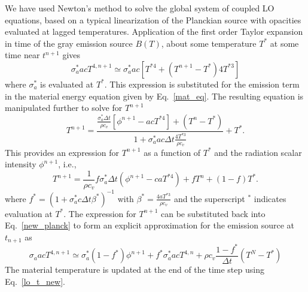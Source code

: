 \documentclass{mc2013}
\begin{document}
We have used Newton's method to solve the global system of coupled LO
equations, based on a typical linearization of the Planckian source with opacities
evaluated at lagged temperatures. Application of the first order Taylor expansion in time of the
gray emission source $B(T)$, about some temperature $T^*$ at some
time near $t^{n+1}$ gives
\begin{equation}\label{new_planck}
    \sigma_a^* a c T^{4,n+1} \simeq \sigma_a^* a c \left[T^{*4} + (T^{n+1} - T^*) 4T^{*3} \right]
\end{equation}
where $\sigma_a^*$ is evaluated at $T^*$. This expression is substituted for the
emission term in the material
energy equation given by Eq.~\eqref{mat_eq}.  The resulting equation is manipulated
further to solve for $T^{n+1}$
\begin{equation}
 T^{n+1}  = \frac{ {\displaystyle \frac{\sigma_a^* \Delta t}{\rho
c_v}}  \left[ \phi^{n+1} -  a c T^{*4} \right] + (T^n - T^*) }{1 +
        \sigma_a^* a c \Delta t\frac{\displaystyle 4
T^{*3}}{\displaystyle \rho c_v } } + T^*.
\end{equation}
This provides an expression for $T^{n+1}$ as a
function of $T^*$ and the radiation scalar intensity $\phi^{n+1}$, i.e.,
\begin{equation}
\label{lo_t_new}
T^{n+1}  = \frac{1}{\rho c_v } f\sigma_a^* \Delta t \left( \phi^{n+1} - c a T^{*4} \right)
+ f T^n + (1-f) T^*.
\end{equation}
where $f^* = (1 + \sigma_a^* c \Delta t \beta^*)^{-1}$ with
$\beta^* = \frac{4 a T^{*3}}{\rho c_v}$ and the superscript $^*$ indicates evaluation
at $T^*$. The
expression for $T^{n+1}$ can be substituted back into Eq.~\eqref{new_planck} to form
an explicit approximation for the emission source at $t_{n+1}$ as
\begin{equation}\label{t_next1}
    \sigma_a a c T^{4,n+1} \simeq \sigma_a^* (1 -f^*) \phi^{n+1}
    + f^* \sigma_a^* a c T^{4,n} + \rho c_v\frac{1-f^*}{\Delta t} (T^N - T^*)
\end{equation}
The material temperature is updated at the end of the time step using Eq.~\ref{lo_t_new}.
\end{document}
